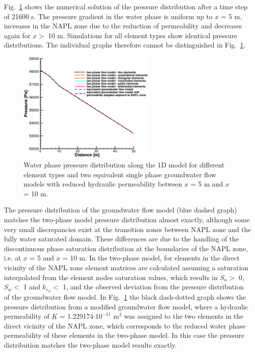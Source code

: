 Fig.~\ref{profiles_pressure_NAPLflow} shows the numerical solution of the pressure distribution after a time step of 21600 s. The pressure gradient in the water phase is uniform up to $x$ = 5 m, increases in the NAPL zone due to the reduction of permeability and decreases again for $x>$ 10 m. Simulations for all element types show identical pressure distributions. The individual graphs therefore cannot be distinguished in Fig.~\ref{profiles_pressure_NAPLflow}.

\begin{figure}[htbp]
\centering
\includegraphics[width=0.6\textwidth]{C/figures/NAPL_diss_pressure.eps}
\caption{Water phase pressure distribution along the 1D model for different element types and two equivalent single phase groundwater flow models with reduced hydraulic permeability between $x$ = 5 m and $x$ = 10 m.}
\label{profiles_pressure_NAPLflow}
\end{figure}

The pressure distribution of the groundwater flow model (blue dashed graph) matches the two-phase model pressure distribution almost exactly, although some very small discrepancies exist at the transition zones between NAPL zone and the fully water saturated domain. These differences are due to the handling of the discontinuous phase saturation distribution at the boundaries of the NAPL zone, i.e. at $x$ = 5 and $x$ = 10 m. In the two-phase model, for elements in the direct vicinity of the NAPL zone element matrices are calculated assuming a saturation interpolated from the element nodes saturation values, which results in $S_n >$ 0, $S_w <$ 1 and $k_{r_w} <$ 1, and the observed deviation from the pressure distribution of the groundwater flow model. In Fig.~\ref{profiles_pressure_NAPLflow} the black dash-dotted graph shows the pressure distribution from a modified groundwater flow model, where a hydraulic permeability of $K$ = 1.229174$\cdot10^{-11}$ m$^2$ was assigned to the two elements in the direct vicinity of the NAPL zone, which corresponds to the reduced water phase permeability of these elements in the two-phase model. In this case the pressure distribution matches the two-phase model results exactly.

